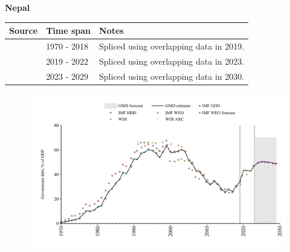 \documentclass[12pt,a4paper,landscape]{article}
\begin{document}
\begin{adjustbox}{max totalsize={\paperwidth}{\paperheight},center}
\begin{minipage}[t][\textheight][t]{\textwidth}
\vspace*{0.5cm}
{}
\begin{center}
{\Large\bfseries Nepal}
\end{center}
\vspace{0.5cm}
\begin{table}[H]
\centering
\small
\begin{tabular}{|l|l|l|}
\hline
\textbf{Source} & \textbf{Time span} & \textbf{Notes} \\
\hline
\rowcolor{white}\cite{IMF_GDD}& 1970 - 2018 &Spliced using overlapping data in 2019.\\
\rowcolor{lightgray}\cite{IMF_WEO}& 2019 - 2022 &Spliced using overlapping data in 2023.\\
\rowcolor{white}\cite{IMF_WEO_forecast}& 2023 - 2029 &Spliced using overlapping data in 2030.\\
\hline
\end{tabular}
\end{table}
\begin{figure}[H]
\centering
\includegraphics[width=\textwidth,height=0.6\textheight,keepaspectratio]{graphs/NPL_govdebt_GDP.pdf}
\end{figure}
\end{minipage}
\end{adjustbox}
\end{document}
